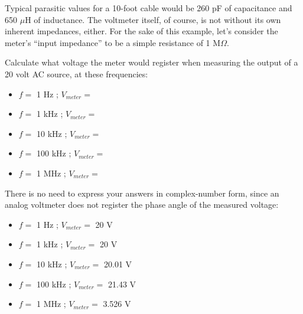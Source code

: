 Typical parasitic values for a 10-foot cable would be 260 pF of capacitance and 650 $\mu$H of inductance.  The voltmeter itself, of course, is not without its own inherent impedances, either.  For the sake of this example, let's consider the meter's ``input impedance'' to be a simple resistance of 1 M$\Omega$.

Calculate what voltage the meter would register when measuring the output of a 20 volt AC source, at these frequencies:

\begin{itemize}
\item{} $f =$ 1 Hz ; $V_{meter} =$
\item{} $f =$ 1 kHz ; $V_{meter} =$
\item{} $f =$ 10 kHz ; $V_{meter} =$
\item{} $f =$ 100 kHz ; $V_{meter} =$
\item{} $f =$ 1 MHz ; $V_{meter} =$
\end{itemize}







There is no need to express your answers in complex-number form, since an analog voltmeter does not register the phase angle of the measured voltage:

\begin{itemize}
\item{} $f =$ 1 Hz ; $V_{meter} =$ 20 V
\item{} $f =$ 1 kHz ; $V_{meter} =$ 20 V
\item{} $f =$ 10 kHz ; $V_{meter} =$ 20.01 V
\item{} $f =$ 100 kHz ; $V_{meter} =$ 21.43 V
\item{} $f =$ 1 MHz ; $V_{meter} =$ 3.526 V
\end{itemize}










